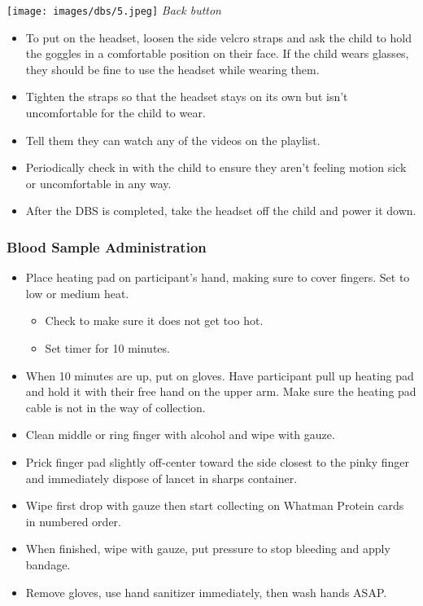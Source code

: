 \documentclass[
]{book}
\providecommand{\tightlist}{%
  \setlength{\itemsep}{0pt}\setlength{\parskip}{0pt}}
\begin{document}
\texttt{[image: images/dbs/5.jpeg]} \emph{Back button}

\begin{itemize}
\tightlist
\item
  To put on the headset, loosen the side velcro straps and ask the child to hold the goggles in a comfortable position on their face. If the child wears glasses, they should be fine to use the headset while wearing them.
\item
  Tighten the straps so that the headset stays on its own but isn't uncomfortable for the child to wear.
\item
  Tell them they can watch any of the videos on the playlist.
\item
  Periodically check in with the child to ensure they aren't feeling motion sick or uncomfortable in any way.
\item
  After the DBS is completed, take the headset off the child and power it down.
\end{itemize}

\hypertarget{blood-sample-administration}{%
\subsubsection{Blood Sample Administration}\label{blood-sample-administration}}

\begin{itemize}
\tightlist
\item
  Place heating pad on participant's hand, making sure to cover fingers. Set to low or medium heat.

  \begin{itemize}
  \tightlist
  \item
    Check to make sure it does not get too hot.
  \item
    Set timer for 10 minutes.
  \end{itemize}
\item
  When 10 minutes are up, put on gloves. Have participant pull up heating pad and hold it with their free hand on the upper arm. Make sure the heating pad cable is not in the way of collection.
\item
  Clean middle or ring finger with alcohol and wipe with gauze.
\item
  Prick finger pad slightly off-center toward the side closest to the pinky finger and immediately dispose of lancet in sharps container.
\item
  Wipe first drop with gauze then start collecting on Whatman Protein cards in numbered order.
\item
  When finished, wipe with gauze, put pressure to stop bleeding and apply bandage.
\item
  Remove gloves, use hand sanitizer immediately, then wash hands ASAP.
\end{itemize}
\end{document}
